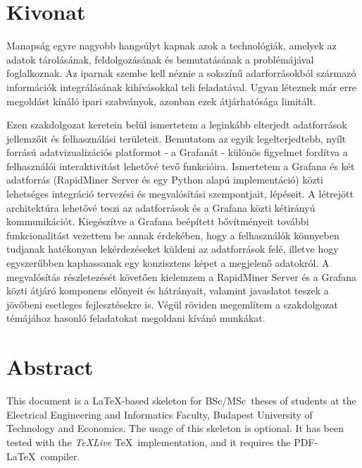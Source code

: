 \setcounter{page}{1}

\selecthungarian

\chapter*{Kivonat}

Manapság egyre nagyobb hangsúlyt kapnak azok a technológiák, amelyek az adatok tárolásának, feldolgozásának és bemutatásának a problémájával foglalkoznak. Az iparnak szembe kell néznie a sokszínű adarforrásokból származó információk integrálásának kihívásokkal teli feladatával. Ugyan léteznek már erre megoldást kínáló ipari szabványok, azonban ezek átjárhatósága limitált.

Ezen szakdolgozat keretein belül ismertetem a leginkább elterjedt adatforrások jellemzőit és felhasználási területeit. Bemutatom az egyik legelterjedtebb, nyílt forrású adatvizualizációs platformot - a Grafanát - különös figyelmet fordítva a felhasználói interaktivitást lehetővé tevő funkcióira. Ismertetem a Grafana és két adatforrás (RapidMiner Server és egy Python alapú implementáció) közti lehetséges integráció tervezési és megvalósítási szempontjait, lépéseit. A létrejött architektúra lehetővé teszi az adatforrások és a Grafana közti kétirányú kommunikációt. Kiegészítve a Grafana beépített bővítményeit további funkcionalitást vezettem be annak érdekében, hogy a felhasználók könnyeben tudjanak hatékonyan lekérdezéseket küldeni az adatforrások felé, illetve hogy egyszerűbben kaphassanak egy konzisztens képet a megjelenő adatokról. A megvalósítás részletezését követően kielemzem a RapidMiner Server és a Grafana közti átjáró komponens előnyeit és hátrányait, valamint javaslatot teszek a jövőbeni esetleges fejlesztésekre is. Végül röviden megemlítem a szakdolgozat témájához hasonló feladatokat megoldani kívánó munkákat.




\vfill
\selectenglish


\chapter*{Abstract}

This document is a \LaTeX-based skeleton for BSc/MSc~theses of students at the Electrical Engineering and Informatics Faculty, Budapest University of Technology and Economics. The usage of this skeleton is optional. It has been tested with the \emph{TeXLive} \TeX~implementation, and it requires the PDF-\LaTeX~compiler.


\vfill
\selectthesislanguage

\setcounter{romanPage}{\value{page}}
